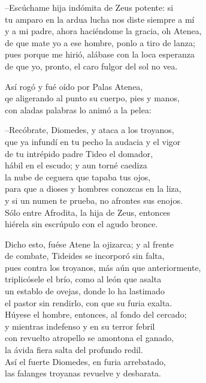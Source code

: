 --Escúchame hija indómita de Zeus potente: si\\
tu amparo en la ardua lucha nos diste siempre a mí\\
y a mi padre, ahora haciéndome la gracia, oh Atenea,\\
de que mate yo a ese hombre, ponlo a tiro de lanza;\\
pues porque me hirió, alábase con la loca esperanza\\
de que yo, pronto, el caro fulgor del sol no vea.\par
Así rogó y fué oído por Palas Atenea,\\
qe aligerando al punto su cuerpo, pies y manos,\\
con aladas palabras lo animó a la pelea:\par
--Recóbrate, Diomedes, y ataca a los troyanos,\\
que ya infundí en tu pecho la audacia y el vigor\\
de tu intrépido padre Tideo el domador,\\
hábil en el escudo; y aun torné caediza\\
la nube de ceguera que tapaba tus ojos,\\
para que a dioses y hombres conozcas en la liza,\\
y si un numen te prueba, no afrontes sus enojos.\\
Sólo entre Afrodita, la hija de Zeus, entonces\\
hiérela sin escrúpulo con el agudo bronce.\par
Dicho esto, fuése Atene la ojizarca; y al frente\\
de combate, Tideides se incorporó sin falta,\\
pues contra los troyanos, más aún que anteriormente,\\
triplicósele el brío, como al león que asalta\\
un establo de ovejas, donde lo ha lastimado\\
el pastor sin rendirlo, con que su furia exalta.\\
Húyese el hombre, entonces, al fondo del cercado;\\
y mientras indefenso y en su terror febril\\
con revuelto atropello se amontona el ganado,\\
la ávida fiera salta del profundo redil.\\
Así el fuerte Diomedes, en furia arrebatado,\\
las falanges troyanas revuelve y desbarata.\par
